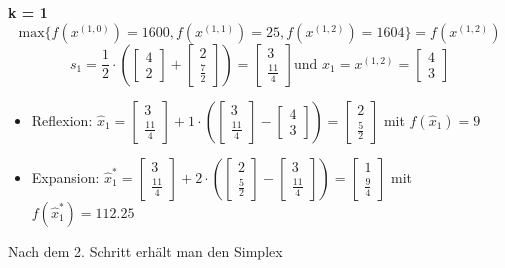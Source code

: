 \documentclass[a4paper, 12pt]{report}
\begin{document}
\textbf{k = 1}\\
$$\text{max}\{f(x^{(1,0)}) = 1600, f(x^{(1,1)}) = 25, f(x^{(1,2)}) = 1604\} = f(x^{(1,2)})$$
$$s_1 = \frac{1}{2}\cdot (\begin{bmatrix}4\\2\end{bmatrix} + \begin{bmatrix}2\\\frac{7}{2}\end{bmatrix}) = \begin{bmatrix}3\\\frac{11}{4}\end{bmatrix} \text{und } x_1 = x^{(1,2)} = \begin{bmatrix}4\\3\end{bmatrix}$$
\begin{itemize}
\item Reflexion: $\hat x_1 = \begin{bmatrix}3\\\frac{11}{4}\end{bmatrix} + 1\cdot(\begin{bmatrix}3\\\frac{11}{4}\end{bmatrix} - \begin{bmatrix}4\\3\end{bmatrix}) = \begin{bmatrix}2\\\frac{5}{2}\end{bmatrix}$ mit $f(\hat x_1) = 9$
\item Expansion: $\hat x_1^* = \begin{bmatrix}3\\\frac{11}{4}\end{bmatrix} + 2\cdot(\begin{bmatrix}2\\\frac{5}{2}\end{bmatrix} - \begin{bmatrix}3\\\frac{11}{4}\end{bmatrix}) = \begin{bmatrix}1\\\frac{9}{4}\end{bmatrix}$ mit $f(\hat x_1^*) = 112.25$
\end{itemize}

Nach dem 2. Schritt erhält man den Simplex
\end{document}
